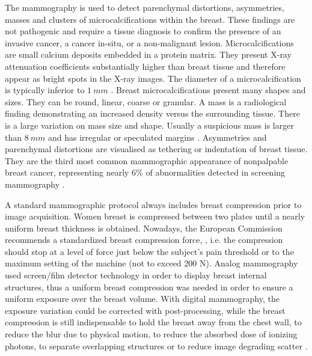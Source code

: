 The mammography is used to detect parenchymal distortions, asymmetries, masses and clusters of microcalcifications within the breast.  These findings are not pathogenic
and require a tissue diagnosis to confirm the
presence of an invasive cancer, a cancer in-situ, or a non-malignant lesion. Microcalcifications are small calcium deposits embedded in a protein matrix. They present X-ray attenuation coefficients substantially higher than breast tissue and therefore appear as bright spots in the X-ray images. The diameter of a microcalcification
is typically inferior to $1\ mm$ \citep{henrot_breast_2014}. Breast microcalcifications present many shapes and sizes.  They can be round, linear, coarse or granular.  A mass is a radiological finding demonstrating an increased density versus the surrounding tissue. There is a large variation on mass size and shape. Usually a suspicious mass is larger than $8\ mm$ and has irregular or speculated margins \citep{mckenna_abnormal_1994}.  Asymmetries and parenchymal distortions are visualised as tethering or indentation of breast tissue. They are the
third most common mammographic appearance of nonpalpable
breast cancer, representing nearly 6\% of abnormalities detected in screening mammography \citep{gaur_architectural_2013}. 

A standard mammographic protocol always includes breast compression prior to image acquisition. Women breast is compressed between two plates until a nearly uniform breast thickness is obtained. Nowadays, the European Commission recommends a standardized breast compression force, , i.e. the compression should stop at a level of force just below the subject’s pain threshold or to the maximum setting of the machine (not to exceed 200 N). Analog mammography used screen/film detector technology in order to display breast internal structures, thus a uniform breast compression was needed in order to ensure a uniform exposure over the breast volume. With digital mammography, the exposure variation could be corrected with post-processing, while the breast compression is still indispensable to hold the breast away from the chest wall, to reduce the blur due to physical motion, to reduce the absorbed dose of ionizing photons, to separate overlapping structures or to reduce image degrading scatter \citep{kopans2007breast}.



